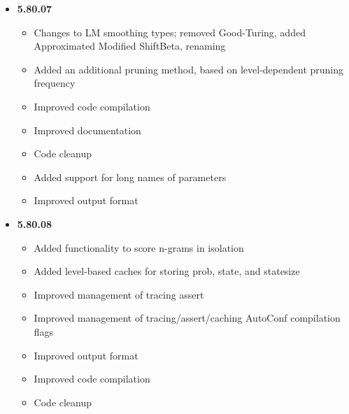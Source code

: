 \begin{itemize}
\begin{itemize}
\end{itemize}
\item {\bf 5.80.07}
\begin{itemize}
\item Changes to LM smoothing types; removed Good-Turing, added Approximated Modified ShiftBeta, renaming
\item Added an additional pruning method, based on level-dependent pruning frequency
\item Improved code compilation
\item Improved documentation
\item Code cleanup
\item Added support for long names of parameters
\item Improved output format 
\end{itemize}
\item {\bf 5.80.08}
\begin{itemize}
\item Added functionality to score n-grams in isolation
\item Added level-based caches for storing prob, state, and statesize
\item Improved management of tracing assert
\item Improved management of tracing/assert/caching AutoConf compilation flags
\item Improved output format
\item Improved code compilation
\item Code cleanup
\end{itemize}
\end{itemize}



